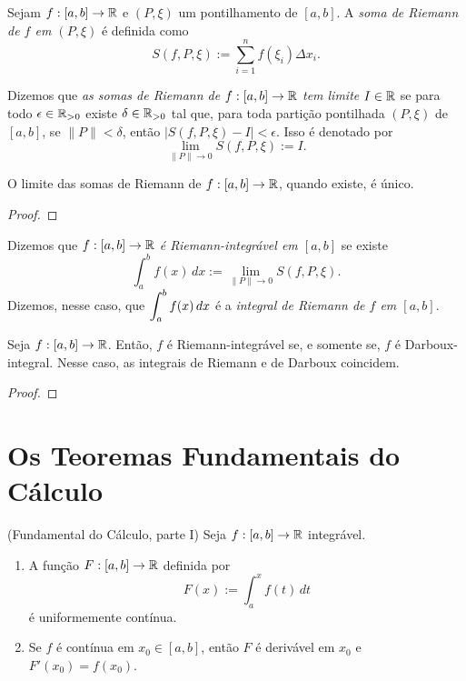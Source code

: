 \begin{definition}
    Sejam $f : [a,b] \to \mathbb{R}$ e $(P, \xi)$ um pontilhamento de $[a,b]$. A \emph{soma de Riemann de $f$ em $(P, \xi)$} é definida como
        \[
            S(f, P, \xi) := \sum_{i=1}^{n} f(\xi_i) \Delta x_i.
        \]
\end{definition}

\begin{definition}
    Dizemos que \emph{as somas de Riemann de $f : [a,b] \to \mathbb{R}$ tem limite $I \in \mathbb{R}$} se para todo $\epsilon \in \mathbb{R}_{>0}$ existe $\delta \in \mathbb{R}_{>0}$ tal que, para toda partição pontilhada $(P, \xi)$ de $[a,b]$, se $\|P\| < \delta$, então $|S(f,P,\xi) - I| < \epsilon$. Isso é denotado por
        \[
            \lim_{\|P\| \to 0} S(f,P,\xi) := I.
        \]
\end{definition}

\begin{proposition}
    O limite das somas de Riemann de $f : [a,b] \to \mathbb{R}$, quando existe, é único.
\end{proposition}

\begin{proof}
    \blackproof
\end{proof}

\begin{definition}
    Dizemos que \emph{$f : [a,b] \to \mathbb{R}$ é Riemann-integrável em $[a,b]$} se existe
        \[
            \int_{a}^{b} f(x) \, dx := \lim_{\|P\| \to 0} S(f,P,\xi).
        \]
    Dizemos, nesse caso, que
        $ \displaystyle
            \int_{a}^{b} f(x) \, dx
        $
    é a \emph{integral de Riemann de $f$ em $[a,b]$}.
\end{definition}

\begin{proposition}
    Seja $f : [a,b] \to \mathbb{R}$. Então, $f$ é Riemann-integrável se, e somente se, $f$ é Darboux-integral. Nesse caso, as integrais de Riemann e de Darboux coincidem.
\end{proposition}

\begin{proof}
    \blackproof
\end{proof}

\section{Os Teoremas Fundamentais do Cálculo}

\begin{theorem}(Fundamental do Cálculo, parte I) \label{teo.calc1:TFC1}
     Seja $f: [a,b] \to \mathbb{R}$ integrável.
        \begin{enumerate}[leftmargin=*, align=left, label=\textbf{(\alph*)}]
            \item  A função $F: [a,b] \to \mathbb{R}$ definida por
                \[
                    F(x) := \int_{a}^{x} f(t) \, dt
                \]
            é uniformemente contínua.
            \item Se $f$ é contínua em $x_0 \in [a,b]$, então $F$ é derivável em $x_0$ e $F'(x_0) = f(x_0)$.
        \end{enumerate} 
\end{theorem}

